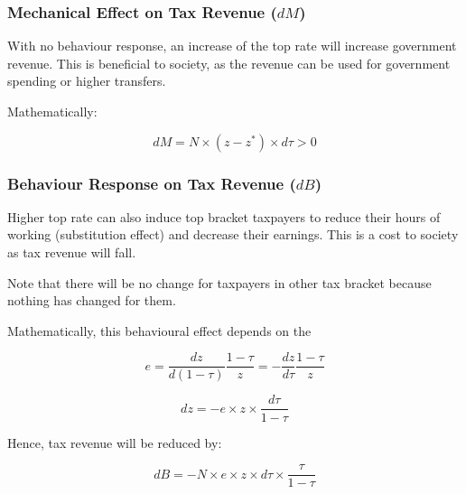         \subsubsection{Mechanical Effect on Tax Revenue ($dM$)}

            With no behaviour response, an increase of the top rate will increase government revenue. This is beneficial to society, as the revenue can be used for government spending or higher transfers.

            Mathematically:

            \begin{equation}
                dM = N \times (z-z^*) \times d\tau > 0
                \label{eqn:tax_top_TR}
            \end{equation}

        \subsubsection{Behaviour Response on Tax Revenue ($dB$)}

            Higher top rate can also induce top bracket taxpayers to reduce their hours of working (substitution effect) and decrease their earnings. This is a cost to society as tax revenue will fall.

            Note that there will be no change for taxpayers in other tax bracket because nothing has changed for them.

            Mathematically, this behavioural effect depends on the 

            \begin{equation*}
                e = \frac{d z}{d (1-\tau)} \frac{1-\tau}{z} = -\frac{d z}{d \tau} \frac{1-\tau}{z}
            \end{equation*}
            
            \begin{equation*}
                dz = -e \times z \times \frac{d\tau}{1-\tau}
            \end{equation*}

            Hence, tax revenue will be reduced by:

            \begin{equation}
                dB = - N \times e \times z \times d\tau \times \frac{\tau}{1-\tau}
                \label{eqn:tax_top_BR}
            \end{equation}


